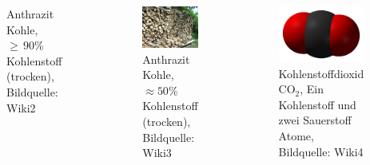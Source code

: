 \begin{frame}
\begin{columns}
\begin{figure}
			\caption{Anthrazit Kohle, $\geq\,90$\% Kohlenstoff (trocken), Bildquelle: Wiki2}
		\end{figure}
		\begin{figure}
			\centering
			\includegraphics[width=\linewidth]{bilder/kohlenstoff/holz}
			\caption{Anthrazit Kohle, $\approx 50$\% Kohlenstoff (trocken), Bildquelle: Wiki3}
		\end{figure}
		\begin{figure}
			\centering
			\includegraphics[width=\linewidth]{bilder/kohlenstoff/co2}
			\caption{Kohlenstoffdioxid $\text{CO}_2$, Ein Kohlenstoff und zwei Sauerstoff Atome, Bildquelle: Wiki4}
		\end{figure}
	\end{columns}
		\begin{itemize}
	

\end{itemize}
\end{frame}

